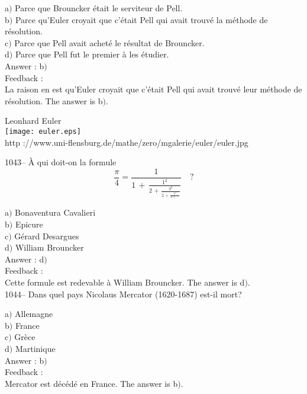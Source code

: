 \documentclass[letterpaper, 12pt]{article}
\begin{document}
a$)$ Parce que Brouncker \'etait le serviteur de Pell. \\
b$)$ Parce qu'Euler croyait que c'\'etait Pell qui avait trouv\'e la
m\'ethode de r\'esolution.  \\
c$)$ Parce que Pell avait achet\'e le r\'esultat de Brouncker.  \\
d$)$ Parce que Pell fut le premier \`a les \'etudier.\\

Answer : b$)$\\

Feedback : \\
La raison en est qu'Euler croyait que c'\'etait Pell qui avait
trouv\'e leur m\'ethode de r\'esolution.
The answer is b$)$.\\
        \begin{center}
        Leonhard Euler\\
    \texttt{[image: euler.eps]}\\
        {\footnotesize http
://www.uni-flensburg.de/mathe/zero/mgalerie/euler/euler.jpg}
    \end{center}

1043-- \`A qui doit-on la formule
$$\displaystyle{\frac{\pi}4=\frac1{1\,+\,\frac{1^2}{2\,+\,\frac{3^2}{2\,+\,\frac{5^2}{2\,+\,\ldots}}}}}\quad?$$

a$)$ Bonaventura Cavalieri \\
b$)$ Epicure \\
c$)$ G\'erard Desargues  \\
d$)$ William Brouncker\\

Answer : d$)$\\

Feedback : \\
Cette formule est redevable \`a William Brouncker.
The answer is d$)$.\\

1044-- Dans quel pays Nicolaus Mercator (1620-1687) est-il mort?

a$)$ Allemagne \\
b$)$ France  \\
c$)$ Gr\`ece  \\
d$)$ Martinique \\

Answer : b$)$\\

Feedback : \\
Mercator est d\'ec\'ed\'e en France.
The answer is b$)$.\\
\end{document}
